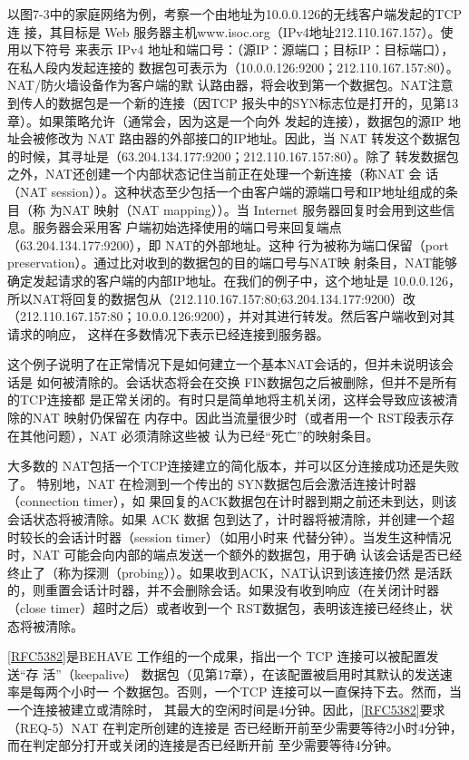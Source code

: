 以图7-3中的家庭网络为例，考察一个由地址为10.0.0.126的无线客户端发起的TCP 连
接，其目标是 Web 服务器主机www.isoc.org（IPv4地址212.110.167.157）。使用以下符号
来表示 IPv4 地址和端口号：（源IP：源端口；目标IP：目标端口），在私人段内发起连接的
数据包可表示为（10.0.0.126:9200；212.110.167.157:80）。NAT/防火墙设备作为客户端的默
认路由器，将会收到第一个数据包。NAT注意到传人的数据包是一个新的连接（因TCP
报头中的SYN标志位是打开的，见第13章）。如果策略允许（通常会，因为这是一个向外
发起的连接），数据包的源IP 地址会被修改为 NAT 路由器的外部接口的IP地址。因此，当
NAT 转发这个数据包的时候，其寻址是（63.204.134.177:9200；212.110.167.157:80）。除了
转发数据包之外，NAT还创建一个内部状态记住当前正在处理一个新连接（称NAT 会
话（NAT session））。这种状态至少包括一个由客户端的源端口号和IP地址组成的条目（称
为NAT 映射（NAT mapping））。当 Internet 服务器回复时会用到这些信息。服务器会采用客
户端初始选择使用的端口号来回复端点（63.204.134.177:9200），即 NAT的外部地址。这种
行为被称为端口保留（port preservation）。通过比对收到的数据包的目的端口号与NAT映
射条目，NAT能够确定发起请求的客户端的内部IP地址。在我们的例子中，这个地址是
10.0.0.126，所以NAT将回复的数据包从（212.110.167.157:80;63.204.134.177:9200）改
（212.110.167.157:80；10.0.0.126:9200），并对其进行转发。然后客户端收到对其请求的响应，
这样在多数情况下表示已经连接到服务器。

这个例子说明了在正常情况下是如何建立一个基本NAT会话的，但并未说明该会话是
如何被清除的。会话状态将会在交换 FIN数据包之后被删除，但并不是所有的TCP连接都
是正常关闭的。有时只是简单地将主机关闭，这样会导致应该被清除的NAT 映射仍保留在
内存中。因此当流量很少时（或者用一个 RST段表示存在其他问题），NAT 必须清除这些被
认为已经“死亡”的映射条目。

大多数的 NAT包括一个TCP连接建立的简化版本，并可以区分连接成功还是失败了。
特别地，NAT 在检测到一个传出的 SYN数据包后会激活连接计时器（connection timer），如
果回复的ACK数据包在计时器到期之前还未到达，则该会话状态将被清除。如果 ACK 数据
包到达了，计时器将被清除，并创建一个超时较长的会话计时器（session timer）（如用小时来
代替分钟）。当发生这种情况时，NAT 可能会向内部的端点发送一个额外的数据包，用于确
认该会话是否已经终止了（称为探测（probing））。如果收到ACK，NAT认识到该连接仍然
是活跃的，则重置会话计时器，并不会删除会话。如果没有收到响应（在关闭计时器（close
timer）超时之后）或者收到一个 RST数据包，表明该连接已经终止，状态将被清除。

\href{https://www.rfc-editor.org/rfc/rfc5382}{[RFC5382]}是BEHAVE 工作组的一个成果，指出一个 TCP 连接可以被配置发送“存
活”（keepalive） 数据包（见第17章），在该配置被启用时其默认的发送速率是每两个小时一
个数据包。否则，一个TCP 连接可以一直保持下去。然而，当一个连接被建立或清除时，
其最大的空闲时间是4分钟。因此，\href{https://www.rfc-editor.org/rfc/rfc5382}{[RFC5382]}要求（REQ-5）NAT 在判定所创建的连接是
否已经断开前至少需要等待2小时4分钟，而在判定部分打开或关闭的连接是否已经断开前
至少需要等待4分钟。

